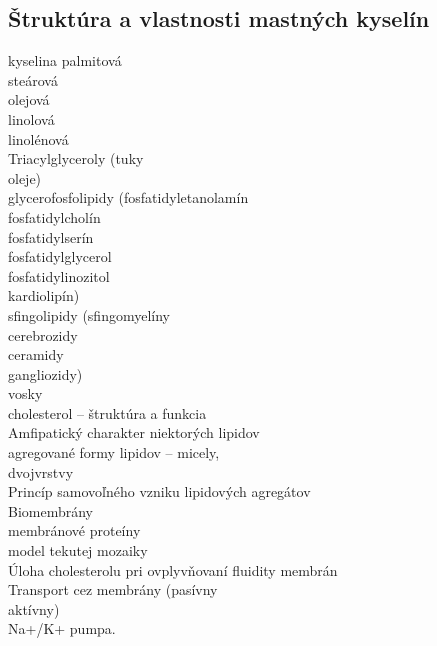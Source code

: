 \subsection*{Štruktúra a vlastnosti mastných kyselín}
\tab kyselina palmitová\\
\tab steárová\\
\tab olejová\\
\tab linolová\\
\tab linolénová\\
Triacylglyceroly (tuky\\
\tab oleje)\\
\tab glycerofosfolipidy (fosfatidyletanolamín\\
\tab fosfatidylcholín\\
\tab fosfatidylserín\\
\tab fosfatidylglycerol\\
\tab fosfatidylinozitol\\
\tab kardiolipín)\\
\tab sfingolipidy (sfingomyelíny\\
\tab cerebrozidy\\
\tab ceramidy\\
\tab gangliozidy)\\
\tab vosky\\
\tab cholesterol -- štruktúra a funkcia\\
Amfipatický charakter niektorých lipidov\\
\tab agregované formy lipidov -- micely,\\
dvojvrstvy\\
Princíp samovoľného vzniku lipidových agregátov\\
Biomembrány\\
\tab membránové proteíny\\
\tab model tekutej mozaiky\\
Úloha cholesterolu pri ovplyvňovaní fluidity membrán\\
Transport cez membrány (pasívny\\
\tab aktívny)\\
Na+/K+ pumpa.\\
\\
